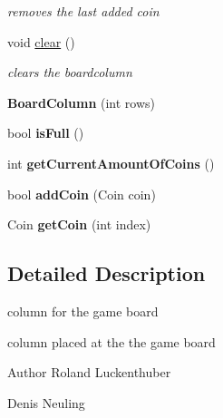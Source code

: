 \begin{DoxyCompactItemize}
\begin{DoxyCompactList}\small\item\em removes the last added coin \end{DoxyCompactList}\item 
\hypertarget{classBoardColumn_a316e15e6e992dc3e0bba17289bad228a}{void \hyperlink{classBoardColumn_a316e15e6e992dc3e0bba17289bad228a}{clear} ()}\label{classBoardColumn_a316e15e6e992dc3e0bba17289bad228a}

\begin{DoxyCompactList}\small\item\em clears the boardcolumn \end{DoxyCompactList}\item 
\hypertarget{classBoardColumn_a8f088cd71325ffbdc839c101ca6a4fda}{{\bfseries \-Board\-Column} (int rows)}\label{classBoardColumn_a8f088cd71325ffbdc839c101ca6a4fda}

\item 
\hypertarget{classBoardColumn_adb1521008180835bd37572a1cda02ef8}{bool {\bfseries is\-Full} ()}\label{classBoardColumn_adb1521008180835bd37572a1cda02ef8}

\item 
\hypertarget{classBoardColumn_a09589c8bd6912dab8a7fb27500002553}{int {\bfseries get\-Current\-Amount\-Of\-Coins} ()}\label{classBoardColumn_a09589c8bd6912dab8a7fb27500002553}

\item 
\hypertarget{classBoardColumn_a060fd86473c5df6a98449e317bc2a364}{bool {\bfseries add\-Coin} (\-Coin coin)}\label{classBoardColumn_a060fd86473c5df6a98449e317bc2a364}

\item 
\hypertarget{classBoardColumn_a8b8107a2cb462ffd73d484b6e1d9b359}{\-Coin {\bfseries get\-Coin} (int index)}\label{classBoardColumn_a8b8107a2cb462ffd73d484b6e1d9b359}

\end{DoxyCompactItemize}


\subsection{\-Detailed \-Description}
column for the game board 

column placed at the the game board

\begin{DoxyAuthor}{\-Author}
\-Roland \-Luckenthuber 

\-Denis \-Neuling 
\end{DoxyAuthor}


